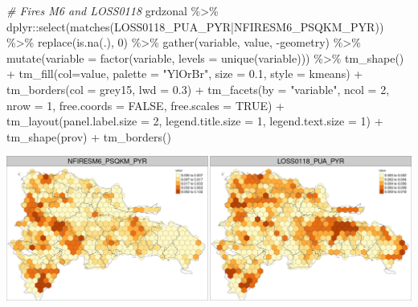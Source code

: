 \documentclass[10pt,landscape,a3paper]{article}
\newenvironment{Shaded}{\begin{snugshade}}{\end{snugshade}}
\newcommand{\AttributeTok}[1]{\textcolor[rgb]{0.77,0.63,0.00}{#1}}
\newcommand{\CommentTok}[1]{\textcolor[rgb]{0.56,0.35,0.01}{\textit{#1}}}
\newcommand{\ConstantTok}[1]{\textcolor[rgb]{0.00,0.00,0.00}{#1}}
\newcommand{\DecValTok}[1]{\textcolor[rgb]{0.00,0.00,0.81}{#1}}
\newcommand{\FloatTok}[1]{\textcolor[rgb]{0.00,0.00,0.81}{#1}}
\newcommand{\FunctionTok}[1]{\textcolor[rgb]{0.00,0.00,0.00}{#1}}
\newcommand{\NormalTok}[1]{#1}
\newcommand{\SpecialCharTok}[1]{\textcolor[rgb]{0.00,0.00,0.00}{#1}}
\newcommand{\StringTok}[1]{\textcolor[rgb]{0.31,0.60,0.02}{#1}}
\begin{document}
\begin{Shaded}
\begin{Highlighting}[]

\CommentTok{\# Fires M6 and LOSS0118}
\NormalTok{grdzonal }\SpecialCharTok{\%\textgreater{}\%}\NormalTok{ dplyr}\SpecialCharTok{::}\FunctionTok{select}\NormalTok{(}\FunctionTok{matches}\NormalTok{(}\StringTok{\textquotesingle{}LOSS0118\_PUA\_PYR|NFIRESM6\_PSQKM\_PYR\textquotesingle{}}\NormalTok{)) }\SpecialCharTok{\%\textgreater{}\%} 
  \FunctionTok{replace}\NormalTok{(}\FunctionTok{is.na}\NormalTok{(.), }\DecValTok{0}\NormalTok{) }\SpecialCharTok{\%\textgreater{}\%} 
  \FunctionTok{gather}\NormalTok{(variable, value, }\SpecialCharTok{{-}}\NormalTok{geometry) }\SpecialCharTok{\%\textgreater{}\%}
  \FunctionTok{mutate}\NormalTok{(}\AttributeTok{variable =} \FunctionTok{factor}\NormalTok{(variable, }\AttributeTok{levels =} \FunctionTok{unique}\NormalTok{(variable))) }\SpecialCharTok{\%\textgreater{}\%} 
  \FunctionTok{tm\_shape}\NormalTok{() }\SpecialCharTok{+}
  \FunctionTok{tm\_fill}\NormalTok{(}\AttributeTok{col=}\StringTok{\textquotesingle{}value\textquotesingle{}}\NormalTok{, }\AttributeTok{palette =} \StringTok{"YlOrBr"}\NormalTok{, }\AttributeTok{size =} \FloatTok{0.1}\NormalTok{, }\AttributeTok{style =} \StringTok{\textquotesingle{}kmeans\textquotesingle{}}\NormalTok{) }\SpecialCharTok{+}
  \FunctionTok{tm\_borders}\NormalTok{(}\AttributeTok{col =} \StringTok{\textquotesingle{}grey15\textquotesingle{}}\NormalTok{, }\AttributeTok{lwd =} \FloatTok{0.3}\NormalTok{) }\SpecialCharTok{+}
  \FunctionTok{tm\_facets}\NormalTok{(}\AttributeTok{by =} \StringTok{"variable"}\NormalTok{, }\AttributeTok{ncol =} \DecValTok{2}\NormalTok{, }\AttributeTok{nrow =} \DecValTok{1}\NormalTok{, }\AttributeTok{free.coords =} \ConstantTok{FALSE}\NormalTok{, }\AttributeTok{free.scales =} \ConstantTok{TRUE}\NormalTok{) }\SpecialCharTok{+}
  \FunctionTok{tm\_layout}\NormalTok{(}\AttributeTok{panel.label.size =} \DecValTok{2}\NormalTok{, }\AttributeTok{legend.title.size =} \DecValTok{1}\NormalTok{, }\AttributeTok{legend.text.size =} \DecValTok{1}\NormalTok{) }\SpecialCharTok{+}
  \FunctionTok{tm\_shape}\NormalTok{(prov) }\SpecialCharTok{+} \FunctionTok{tm\_borders}\NormalTok{()}
\end{Highlighting}
\end{Shaded}

\begin{center}\includegraphics{img/zonal-long-term-grid-13} \end{center}
\end{document}

